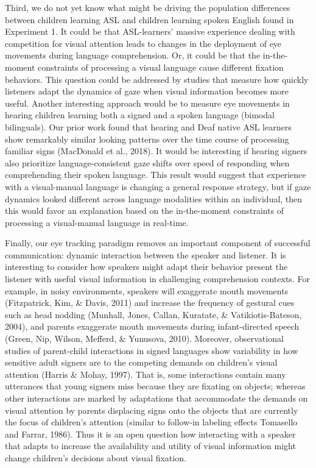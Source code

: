\documentclass[,man,floatsintext]{apa6}
\begin{document}
Third, we do not yet know what might be driving the population differences between children learning ASL and children learning spoken English found in Experiment 1. It could be that ASL-learners' massive experience dealing with competition for visual attention leads to changes in the deployment of eye movements during language comprehension. Or, it could be that the in-the-moment constraints of processing a visual language cause different fixation behaviors. This question could be addressed by studies that measure how quickly listeners adapt the dynamics of gaze when visual information becomes more useful. Another interesting approach would be to measure eye movements in hearing children learning both a signed and a spoken language (bimodal bilinguals). Our prior work found that hearing and Deaf native ASL learners show remarkably similar looking patterns over the time course of processing familiar signs (MacDonald et al., 2018). It would be interesting if hearing signers also prioritize language-consistent gaze shifts over speed of responding when comprehending their spoken language. This result would suggest that experience with a visual-manual language is changing a general response strategy, but if gaze dynamics looked different across language modalities within an individual, then this would favor an explanation based on the in-the-moment constraints of processing a visual-manual language in real-time.

Finally, our eye tracking paradigm removes an important component of successful communication: dynamic interaction between the speaker and listener. It is interesting to consider how speakers might adapt their behavior present the listener with useful visual information in challenging comprehension contexts. For example, in noisy environments, speakers will exaggerate mouth movements (Fitzpatrick, Kim, \& Davis, 2011) and increase the frequency of gestural cues such as head nodding (Munhall, Jones, Callan, Kuratate, \& Vatikiotis-Bateson, 2004), and parents exaggerate mouth movements during infant-directed speech (Green, Nip, Wilson, Mefferd, \& Yunusova, 2010). Moreover, observational studies of parent-child interactions in signed languages show variability in how sensitive adult signers are to the competing demands on children's visual attention (Harris \& Mohay, 1997). That is, some interactions contain many utterances that young signers miss because they are fixating on objects; whereas other interactions are marked by adaptations that accommodate the demands on visual attention by parents displacing signs onto the objects that are currently the focus of children's attention (similar to follow-in labeling effects Tomasello and Farrar, 1986). Thus it is an open question how interacting with a speaker that adapts to increase the availability and utility of visual information might change children's decisions about visual fixation.
\end{document}
